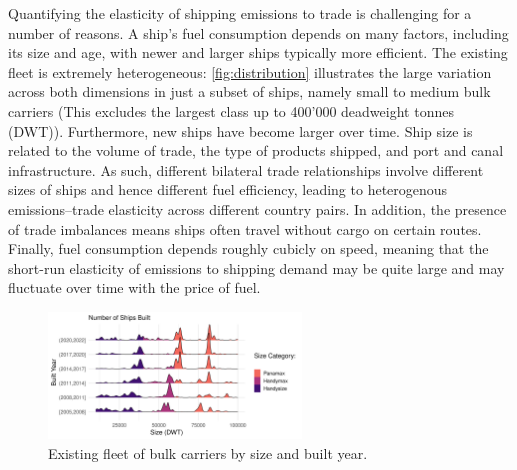 \documentclass[hidelinks, 12pt,letterpaper]{article}
\begin{document}
Quantifying the elasticity of shipping emissions to trade is challenging for a number of reasons. A ship's fuel consumption depends on many factors, including its size and age, with newer and larger ships typically more efficient. The existing fleet is extremely heterogeneous: \autoref{fig:distribution} illustrates the large variation across both dimensions in just a subset of ships, namely small to medium bulk carriers (This excludes the largest class up to 400'000 deadweight tonnes (DWT)). Furthermore, new ships have become larger over time. Ship size is related to the volume of trade, the type of products shipped, and port and canal infrastructure. As such, different bilateral trade relationships involve different sizes of ships and hence different fuel efficiency, leading to heterogenous emissions--trade elasticity across different country pairs. In addition, the presence of trade imbalances means ships often travel without cargo on certain routes. Finally, fuel consumption depends roughly cubicly on speed, meaning that the short-run elasticity of emissions to shipping demand may be quite large and may fluctuate over time with the price of fuel. 

\begin{figure}[h]
  \centering
  \includegraphics[width = 0.6\textwidth]{WFR_Bulkers_Exploration_Size_Built_horizontalridges.png}
  \caption{Existing fleet of bulk carriers by size and built year.}
  \label{fig:distribution}
\end{figure} 
\end{document}
